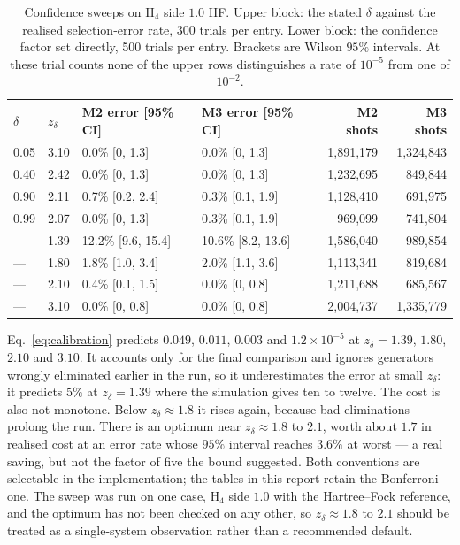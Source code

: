 \documentclass[10pt]{article}
\begin{document}
\begin{table}[!htbp]
\centering
\scriptsize
\caption{Confidence sweeps on H$_4$ side $1.0$ HF. Upper block: the stated $\delta$ against the realised selection-error rate, 300 trials per entry. Lower block: the confidence factor set directly, 500 trials per entry. Brackets are Wilson $95\%$ intervals. At these trial counts none of the upper rows distinguishes a rate of $10^{-5}$ from one of $10^{-2}$.}
\label{tab:calibration}
\begin{tabular}{llllrr}
\toprule
$\delta$ & $z_\delta$ & M2 error [95\% CI] & M3 error [95\% CI] & M2 shots & M3 shots \\
\midrule
0.05 & 3.10 & 0.0\% [0, 1.3] & 0.0\% [0, 1.3] & 1,891,179 & 1,324,843 \\
0.40 & 2.42 & 0.0\% [0, 1.3] & 0.0\% [0, 1.3] & 1,232,695 & 849,844 \\
0.90 & 2.11 & 0.7\% [0.2, 2.4] & 0.3\% [0.1, 1.9] & 1,128,410 & 691,975 \\
0.99 & 2.07 & 0.0\% [0, 1.3] & 0.3\% [0.1, 1.9] & 969,099 & 741,804 \\
\midrule
--- & 1.39 & 12.2\% [9.6, 15.4] & 10.6\% [8.2, 13.6] & 1,586,040 & 989,854 \\
--- & 1.80 & 1.8\% [1.0, 3.4] & 2.0\% [1.1, 3.6] & 1,113,341 & 819,684 \\
--- & 2.10 & 0.4\% [0.1, 1.5] & 0.0\% [0, 0.8] & 1,211,688 & 685,567 \\
--- & 3.10 & 0.0\% [0, 0.8] & 0.0\% [0, 0.8] & 2,004,737 & 1,335,779 \\
\bottomrule
\end{tabular}
\end{table}

Eq.~\eqref{eq:calibration} predicts $0.049$, $0.011$, $0.003$ and
$1.2\times10^{-5}$ at $z_\delta=1.39$, $1.80$, $2.10$ and $3.10$. It accounts only for the final comparison and ignores
generators wrongly eliminated earlier in the run, so it underestimates the error
at small $z_\delta$: it predicts $5\%$ at $z_\delta=1.39$ where the
simulation gives ten to twelve. The cost is also not monotone. Below
$z_\delta\approx1.8$ it rises again, because bad eliminations prolong the run.
There is an optimum near $z_\delta\approx1.8$ to $2.1$, worth about $1.7$ in
realised cost at an error rate whose $95\%$ interval reaches $3.6\%$ at
worst --- a real saving, but not the factor of five the bound suggested. Both
conventions are selectable in the implementation; the tables in this report retain
the Bonferroni one. The sweep was run on one case, H$_4$ side $1.0$ with the
Hartree--Fock reference, and the optimum has not been checked on any other, so
$z_\delta\approx1.8$ to $2.1$ should be treated as a single-system observation
rather than a recommended default.
\end{document}
